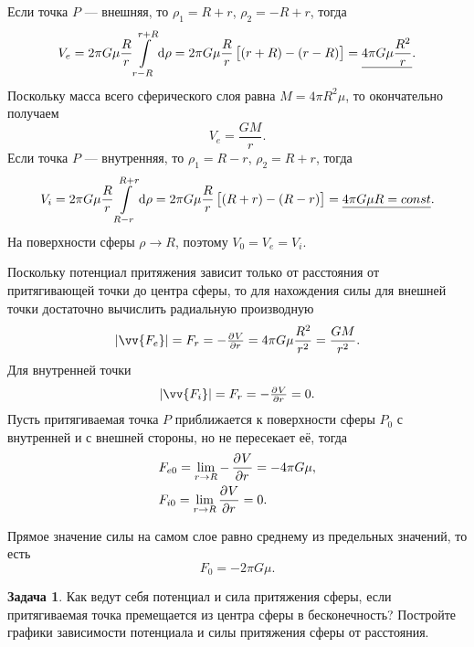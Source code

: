 \documentclass[11pt, a4paper]{article}
\theoremstyle{plain}
\theoremstyle{definition}
\newtheorem{problem}{Задача}[section]
\theoremstyle{remark}
\begin{document}
Если точка $P$ --- внешняя, то $\rho_1 = R + r$, $\rho_2 = - R + r$, тогда
\begin{equation*}
    V_e =
    2\pi G\mu \dfrac{R}{r}\int\limits_{r - R}^{r + R} \dif\rho =
    2\pi G\mu \dfrac{R}{r}\left[ \left( r + R \right) - \left( r - R \right) \right] =
    \underline{4\pi G\mu \dfrac{R^2}{r}}.
\end{equation*}
Поскольку масса всего сферического слоя равна $M = 4\pi R^2\mu$, то окончательно получаем
\begin{equation*}
    V_e = \dfrac{GM}{r}.
\end{equation*}
Если точка $P$ --- внутренняя, то $\rho_1 = R - r$, $\rho_2 = R + r$, тогда
\begin{equation*}
    V_i =
    2\pi G\mu \dfrac{R}{r}\int\limits_{R - r}^{R + r} \dif\rho =
    2\pi G\mu \dfrac{R}{r}\left[ \left( R + r \right) - \left( R - r \right) \right] =
    \underline{4\pi G\mu R = const}.
\end{equation*}
На поверхности сферы $\rho\to R$, поэтому $V_0 = V_e = V_i$.

Поскольку потенциал притяжения зависит только от расстояния от притягивающей точки до центра сферы,
то для нахождения силы для внешней точки достаточно вычислить радиальную производную
\begin{equation*}
    |\vv{F_e}| = F_r = -\pd{V}{r} = 4\pi G\mu \dfrac{R^2}{r^2} = \dfrac{GM}{r^2}.
\end{equation*}
Для внутренней точки 
\begin{equation*}
    |\vv{F_i}| = F_r = -\pd{V}{r} = 0.
\end{equation*}
Пусть притягиваемая точка $P$ приближается к поверхности сферы $P_0$ с внутренней и с внешней
стороны, но не пересекает её, тогда
\begin{align*}
    &F_{e0} = \lim_{r\to R} -\dpd{V}{r} = -4\pi G\mu, \\
    &F_{i0} = \lim_{r\to R} \dpd{V}{r} = 0.
\end{align*}

Прямое значение силы на самом слое равно среднему из предельных значений, то есть
\begin{equation*}
    F_0 = -2\pi G\mu.
\end{equation*}

\begin{problem}
    Как ведут себя потенциал и сила притяжения сферы, если притягиваемая точка премещается из центра
    сферы в бесконечность?
    Постройте графики зависимости потенциала и силы притяжения сферы от расстояния.
\end{problem}
\end{document}
